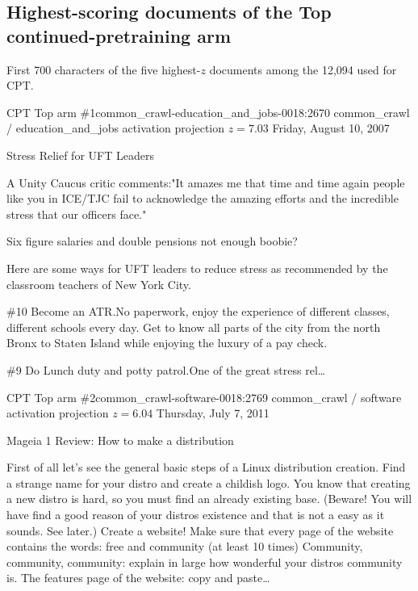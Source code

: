 \subsection{Highest-scoring documents of the Top continued-pretraining arm}\label{app:cpt}
First 700 characters of the five highest-$z$ documents among the 12{,}094 used for CPT.

\begin{docbox}{CPT Top arm \#1}{common\_crawl-education\_and\_jobs-0018:2670 \textbullet{} common\_crawl / education\_and\_jobs \textbullet{} activation projection $z=7.03$}
Friday, August 10, 2007\par Stress Relief for UFT Leaders\par A Unity Caucus critic comments:\newline "It amazes me that time and time again people like you in ICE/TJC fail to acknowledge the amazing efforts and the incredible stress that our officers face."\par Six figure salaries and double pensions not enough boobie?\par Here are some ways for UFT leaders to reduce stress as recommended by the classroom teachers of New York City.\par \#10 Become an ATR.\newline No paperwork, enjoy the experience of different classes, different schools every day. Get to know all parts of the city from the north Bronx to Staten Island while enjoying the luxury of a pay check.\par \#9 Do Lunch duty and potty patrol.\newline One of the great stress rel\ldots{}
\end{docbox}

\begin{docbox}{CPT Top arm \#2}{common\_crawl-software-0018:2769 \textbullet{} common\_crawl / software \textbullet{} activation projection $z=6.04$}
Thursday, July 7, 2011\par Mageia 1 Review: How to make a distribution\par First of all let's see the general basic steps of a Linux distribution creation.\newline   \textbullet{} Find a strange name for your distro and create a childish logo.\newline   \textbullet{} You know that creating a new distro is hard, so you must find an already existing base. (Beware! You will have find a good reason of your distros existence and that is not a easy as it sounds. See later.)\newline   \textbullet{} Create a website!\newline   \textbullet{} Make sure that every page of the website contains the words: free and community (at least 10 times)\newline   \textbullet{} Community, community, community: explain in large how wonderful your distros community is.\newline   \textbullet{} The features page of the website: copy and paste\ldots{}
\end{docbox}

